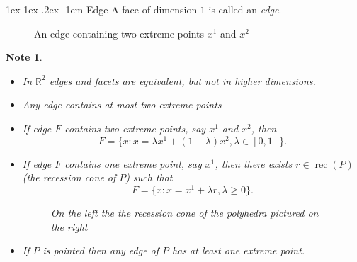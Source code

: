 \documentclass[11pt]{article}
\makeatletter
\renewcommand\paragraph{\@startsection{paragraph}{4}{0mm}%
                                    {1ex \@plus1ex \@minus.2ex}%
                                    {-1em}%
                                    {\normalfont\normalsize\bfseries}}
\newtheorem{note}[fact]{Note}
\newcommand{\R}{\ensuremath{\mathbb R}}
\DeclareMathOperator{\rec}{rec}
\makeatother
\begin{document}
\paragraph{Edge} A face of dimension $1$ is called an \textit{edge}.
\begin{figure}[ht]
\centering
{}
\caption{An edge containing two extreme points $x^1$ and $x^2$}
\end{figure}
\begin{note}
\begin{itemize}
\item In $\R^2$ edges and facets are equivalent, but not in higher dimensions.
\item Any edge contains at most two extreme points
\item If edge $F$ contains two extreme points, say $x^1$ and $x^2$, then
$$F = \{ x : x = \lambda x^1 + (1-\lambda)x^2, \lambda \in [0,1]\}.$$
\item If edge $F$ contains one extreme point, say $x^1$, then there exists $r \in \rec(P)$ (the recession cone of $P$) such that
$$F = \{x : x = x^1 + \lambda r, \lambda \geq 0 \}.$$
\begin{figure}[ht]
\centering
{}
\caption{On the left the the recession cone of the polyhedra pictured on the right}
\end{figure}
\item If $P$ is pointed then any edge of $P$ has at least one extreme point.
\end{itemize}
\end{note}
\end{document}
